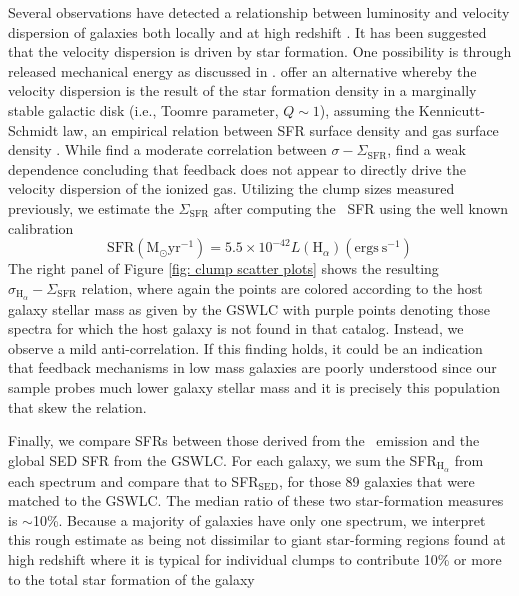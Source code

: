 Several observations have detected a relationship between luminosity and velocity dispersion of galaxies both locally and at high redshift \citep{Dib2006,Green2010,Lehnert2009,Genzel2011}. It has been suggested that the velocity dispersion is driven by star formation. One possibility is through released mechanical energy as discussed in \cite{Lehnert2009}. \cite{Wisnioski2012} offer an alternative whereby the velocity dispersion is the result of the star formation density in a marginally stable galactic disk (i.e., Toomre parameter, $Q\sim1$), assuming the Kennicutt-Schmidt law, an empirical relation between SFR surface density and gas surface density \citep{Schmidt1959,Kennicutt1998a}. While \cite{Wisnioski2012} find a moderate correlation between $\sigma-\Sigma_{\mathrm{SFR}}$, \cite{Genzel2011} find a weak dependence concluding that feedback does not appear to directly drive the velocity dispersion of the ionized gas.  Utilizing the clump sizes measured previously, we estimate the $\Sigma_{\mathrm{SFR}}$ after computing the \ha~SFR using the well known calibration \citep{Kennicutt1998,Calzetti2013}
\begin{equation}
\mathrm{SFR} (\mathrm{M}_{\odot} \mathrm{yr}^{-1}) = 5.5 \times 10^{-42}L(\mathrm{H}_{\alpha}) (\mathrm{ergs\ s}^{-1})
\end{equation}
The right panel of Figure \ref{fig: clump scatter plots} shows the resulting $\sigma_{\mathrm{H}_{\alpha}}-\Sigma_{\mathrm{SFR}}$ relation, where again the points are colored according to the host galaxy stellar mass as given by the GSWLC with purple points denoting those spectra for which the host galaxy is not found in that catalog. Instead, we observe a mild anti-correlation. If this finding holds, it could be an indication that feedback mechanisms in low mass galaxies are poorly understood since our sample probes much lower galaxy stellar mass and it is precisely this population that skew the relation. 


Finally, we compare SFRs between those derived from the \ha~emission and the global SED SFR from the GSWLC. For each galaxy, we sum the SFR$_{\mathrm{H}_{\alpha}}$ from each spectrum and compare that to SFR$_{\mathrm{SED}}$, for those 89 galaxies that were matched to the GSWLC. The median ratio of these two star-formation measures is $\sim$10\%. Because a majority of galaxies have only one spectrum, we interpret this rough estimate as being not dissimilar to giant star-forming regions found at high redshift where it is typical for individual clumps to contribute 10\% or more to the total star formation of the galaxy \citep{Genzel2011, Guo2012, Wisnioski2012}


